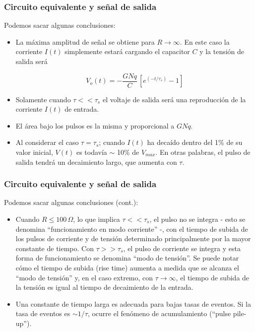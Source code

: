 \documentclass{beamer}
\begin{document}
\begin{frame}
\frametitle{Circuito equivalente y señal de salida}
Podemos sacar algunas conclusiones:
\begin{itemize}
\item La m\'axima amplitud de se\~nal se obtiene para $R \to \infty$. En este
        caso la corriente $I(t)$ simplemente estar\'a cargando el capacitor $C$ y
        la tensi\'on de salida ser\'a

      $$V_o(t) = - \frac{GNq}{C}\, [e^{(-t/\tau_s)} - 1]$$ 

\item Solamente cuando $\tau << \tau_s$ el voltaje de salida ser\'a una 
        reproducci\'on de la corriente $I(t)$ de entrada.
\item El \'area bajo los pulsos es la misma y proporcional a $GNq$.
\item Al considerar el caso $\tau = \tau_s$; cuando $I(t)$ ha deca\'ido dentro
del 1\% de su
      valor inicial, $V(t)$ es todav\'ia $\sim$ 10\% de $V_{max}$. En otras
palabras, el
      pulso de salida tendr\'a un decaimiento largo, que aumenta con $\tau$.
\end{itemize}
\end{frame} 

\begin{frame}
\frametitle{Circuito equivalente y señal de salida}
Podemos sacar algunas conclusiones (cont.):
\begin{itemize}
\item Cuando $R \leq 100\,\Omega$, lo que implica $\tau << \tau_s$, el pulso no
      se integra - esto se denomina {\color{blue}``funcionamiento en modo corriente''} -,
      con el tiempo de subida de los pulsos de corriente y de tensi\'on
      determinado principalmente por la mayor constante de tiempo. Con $\tau
      >> \tau_s$, el pulso de corriente se integra y esta forma de
      funcionamiento se denomina {\color{blue}``modo de tensi\'on''}. Se puede notar c\'omo
      el tiempo de subida (rise time) aumenta a medida que se alcanza el
      ``modo de tensi\'on'' y, en el caso extremo, con $\tau \to \infty$, el 
      tiempo de subida de la tensi\'on es igual al tiempo de decaimiento de la
      entrada.
\item Una constante de tiempo larga es adecuada para bajas tasas de eventos. Si
      la tasa de eventos es $\sim 1/\tau$, ocurre el fen\'omeno de
      acumulamiento (``pulse pile-up'').
\end{itemize}
\end{frame} 
\end{document}

